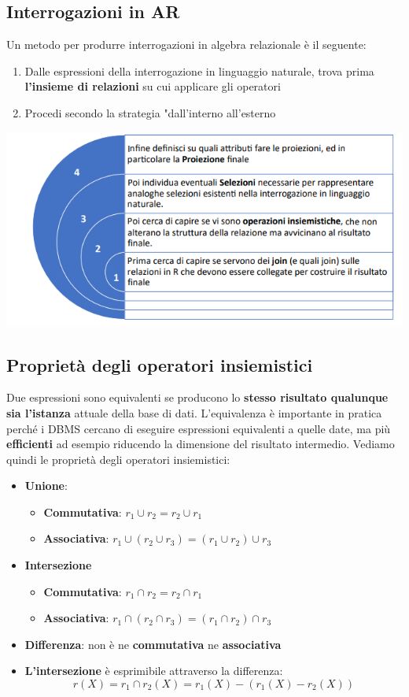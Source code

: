 \documentclass[12pt]{article}
\begin{document}
\subsection{Interrogazioni in AR}
Un metodo per produrre interrogazioni in algebra relazionale è il seguente:
\begin{enumerate}
    \item Dalle espressioni della interrogazione in linguaggio naturale, trova prima \textbf{l'insieme di relazioni} su cui applicare gli operatori
    \item Procedi secondo la strategia "dall'interno all'esterno
\end{enumerate}
\begin{center}
    \includegraphics[width = 1\textwidth]{Images/165.PNG}
\end{center}
\subsection{Proprietà degli operatori insiemistici}
Due espressioni sono equivalenti se producono lo \textbf{stesso risultato qualunque sia l'istanza} attuale della base di dati.
L'equivalenza è importante in pratica perché i DBMS cercano di eseguire espressioni equivalenti a quelle date, ma più \textbf{efficienti} ad esempio riducendo la dimensione del risultato intermedio.
Vediamo quindi le proprietà degli operatori insiemistici:
\begin{itemize}
    \item \textbf{Unione}:
    \begin{itemize}
        \item \textbf{Commutativa}: $r_1 \cup r_2 = r_2 \cup r_1$
        \item \textbf{Associativa}: $r_1 \cup (r_2 \cup r_3) = (r_1 \cup r_2) \cup r_3$
    \end{itemize}
    \item \textbf{Intersezione}
    \begin{itemize}
        \item \textbf{Commutativa}: $r_1 \cap r_2 = r_2 \cap r_1$
        \item \textbf{Associativa}: $r_1 \cap (r_2 \cap r_3) = (r_1 \cap r_2) \cap r_3$
    \end{itemize}
    \item \textbf{Differenza}: non è ne \textbf{commutativa} ne \textbf{associativa}
    \item \textbf{L'intersezione} è esprimibile attraverso la differenza:
    $$r(X) = r_1 \cap r_2(X) = r_1(X) - (r_1(X) - r_2(X))$$
\end{itemize}
\end{document}
